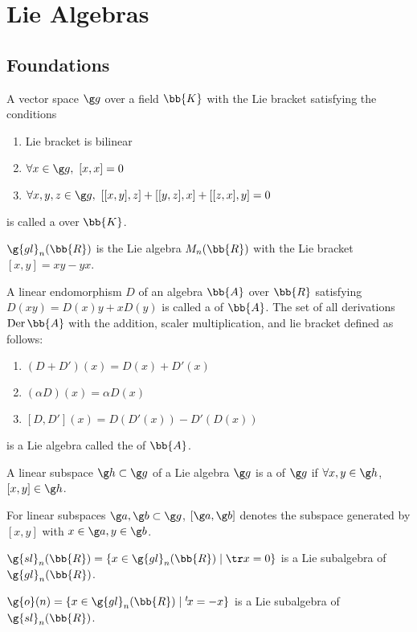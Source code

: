 \newcommand{\gl}{\g{gl}}
\renewcommand{\sl}{\g{sl}}
\renewcommand{\o}{\g{o}}
\section{Lie Algebras}\cite{samu}
\subsection{Foundations}
A vector space $\g g$ over a field $\bb{K}$ with the Lie bracket satisfying the conditions
\begin{enumerate}
\item Lie bracket is bilinear
\item $\forall x \in \g g,\ [x,x] = 0$
\item $\forall x, y, z \in \g g,\ [[x,y],z]+[[y,z],x]+[[z,x],y] = 0$
\end{enumerate}
is called a  over $\bb{K}$.

$\g{gl}_n(\bb{R})$ is the Lie algebra $M_n(\bb{R})$ with the Lie bracket $[x,y] = xy - yx$.

A linear endomorphism $D$ of an algebra $\bb{A}$ over $\bb{R}$ satisfying $D(xy) = D(x)y + xD(y)$ is called a  of $\bb{A}$. The set of all derivations $\mathrm{Der}\, \bb{A}$ with the addition, scaler multiplication, and lie bracket defined as follows:
\begin{enumerate}
\item $(D+D')(x) = D(x)+D'(x)$
\item $(\alpha D)(x) = \alpha D(x)$
\item $[D,D'](x) = D(D'(x)) - D'(D(x))$
\end{enumerate}
is a Lie algebra called the  of $\bb{A}$.

A linear subspace $\g h \subset \g g$ of a Lie algebra $\g g$ is a  of $\g g$ if $\forall x, y \in \g h$, $[x,y] \in \g h$.

For linear subspaces $\g a, \g b \subset \g g$, $[\g a, \g b]$ denotes the subspace generated by $[x,y]$ with $x \in \g a, y \in \g b$.

$\sl_n(\bb{R}) = \{ x \in \gl_n(\bb{R}) \mid \tr x = 0 \} $ is a Lie subalgebra of $\gl_n(\bb{R})$.

$\o(n) = \{ x \in \gl_n(\bb{R}) \mid {}^t\!x = -x \}$ is a Lie subalgebra of $\sl_n(\bb{R})$.

